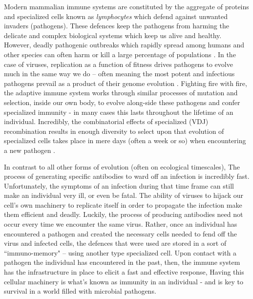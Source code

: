 \documentclass{article}
\begin{document}
Modern mammalian immune systems are constituted by the aggregate of proteins and specialized cells known as \textit{lymphocytes} which
defend against unwanted invaders (pathogens).
These defences keep the pathogens from harming the delicate and complex biological systems which keep us alive and healthy.
However, deadly pathogenic outbreaks which rapidly spread among humans and other species can often harm or kill a large percentage of populations \citep{Wu2020}.
In the case of viruses, replication as a function of fitness drives pathogens to evolve much in the same way we do --
often meaning the most potent and infectious pathogens prevail as a product of their genome evolution \citep{Twiddy2003, Felsenstein1981-zs}.
Fighting fire with fire, the adaptive immune system works through similar processes of mutation and selection, inside our own body,
to evolve along-side these pathogens and confer specialized immunity - in many cases this lasts throughout the lifetime of an individual.
Incredibly, the combinatorial effects of specialized (VDJ) recombination results in enough diversity to select upon that evolution of specialized cells
takes place in mere days (often a week or so) when encountering a new pathogen \citep{Jung2004}.


In contrast to all other forms of evolution (often on ecological timescales), 
The process of generating specific antibodies to ward off an infection is incredibly fast.
Unfortunately, the symptoms of an infection during that time frame can still make an individual very ill, or even be fatal.
The ability of viruses to hijack our cell's own machinery to replicate itself in order to propagate the infection make them efficient and deadly.
Luckily, the process of producing antibodies need not occur every time we encounter the same virus.
Rather, once an individual has encountered a pathogen and created the necessary cells needed to fend off the virus and infected cells,
the defences that were used are stored in a sort of ``immuno-memory" -- using another type specialized cell.
Upon contact with a pathogen the individual has encountered in the past, then,
the immune system has the infrastructure in place to elicit a fast and effective response, 
Having this cellular machinery is what's known as immunity in an individual - and is key to survival in a world filled with microbial pathogens.
\end{document}

